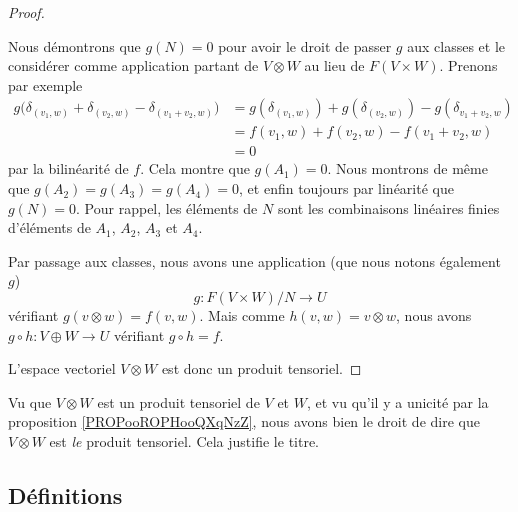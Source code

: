 \begin{proof}
\begin{subproof}
            Nous démontrons que \( g(N)=0\) pour avoir le droit de passer \( g\) aux classes et le considérer comme application partant de \( V\otimes W\) au lieu de \( F(V\times W)\). Prenons par exemple
            \begin{subequations}
                \begin{align}
                    g\big( \delta_{(v_1,w)}+\delta_{(v_2,w)}-\delta_{(v_1+v_2,w)} \big)&=g( \delta_{(v_1,w)} )+g(\delta_{(v_2,w)})-g(\delta_{v_1+v_2,w})\\
                    &=f(v_1,w)+f(v_2,w)-f(v_1+v_2,w)\\
                    &=0
                \end{align}
            \end{subequations}
            par la bilinéarité de \( f\). Cela montre que \( g(A_1)=0\). Nous montrons de même que \( g(A_2)=g(A_3)=g(A_4)=0\), et enfin toujours par linéarité que \( g(N)=0\). Pour rappel, les éléments de \( N\) sont les combinaisons linéaires finies d'éléments de \( A_1\), \( A_2\), \( A_3\) et \( A_4\).

            Par passage aux classes, nous avons une application (que nous notons également \( g\))
            \begin{equation}
                g\colon F(V\times W)/N\to U
            \end{equation}
            vérifiant \( g(v\otimes w)=f(v,w)\). Mais comme \( h(v,w)=v\otimes w\), nous avons $g\circ h\colon V\oplus W\to U$ vérifiant \( g\circ h=f\).
    \end{subproof}
    L'espace vectoriel \( V\otimes W\) est donc un produit tensoriel.
\end{proof}

Vu que \( V\otimes W\) est un produit tensoriel de \( V\) et \( W\), et vu qu'il y a unicité par la proposition \ref{PROPooROPHooQXqNzZ}, nous avons bien le droit de dire que \( V\otimes W\) est \emph{le} produit tensoriel. Cela justifie le titre.

\subsection{Définitions}
\label{SECooUKRYooZjagcX}

